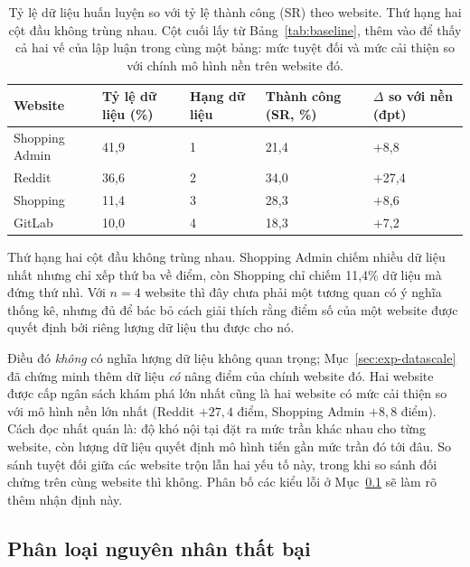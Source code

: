 \begin{table}[htbp]
  \centering
  \caption[Tỷ lệ dữ liệu so với điểm số theo website]{Tỷ lệ dữ liệu huấn
    luyện so với tỷ lệ thành công (SR) theo website. Thứ hạng hai cột đầu không
    trùng nhau. Cột cuối lấy từ Bảng~\ref{tab:baseline}, thêm vào để thấy cả hai vế
    của lập luận trong cùng một bảng: mức tuyệt đối và mức cải thiện so với chính
  mô hình nền trên website đó.}
  \label{tab:crosssite}
  \small
  \begin{tabular}{@{}L{3.4cm} R{2.7cm} R{2.2cm} R{2.4cm} R{2.6cm}@{}}
    \toprule
    \textbf{Website} & \textbf{Tỷ lệ dữ liệu (\%)} & \textbf{Hạng dữ liệu} & \textbf{Thành công (SR, \%)} & \textbf{$\Delta$ so với nền (đpt)} \\
    \midrule
    Shopping Admin & 41{,}9 & 1 & 21{,}4 & $+$8{,}8 \\
    Reddit & 36{,}6 & 2 & 34{,}0 & $+$27{,}4 \\
    Shopping & 11{,}4 & 3 & 28{,}3 & $+$8{,}6 \\
    GitLab & 10{,}0 & 4 & 18{,}3 & $+$7{,}2 \\
    \bottomrule
  \end{tabular}
\end{table}

Thứ hạng hai cột đầu không trùng nhau. Shopping Admin chiếm nhiều dữ liệu nhất nhưng chỉ xếp thứ ba về điểm, còn Shopping chỉ chiếm 11{,}4\% dữ liệu mà đứng thứ nhì. Với $n = 4$ website thì đây chưa phải một tương quan có ý nghĩa thống kê, nhưng đủ để bác bỏ cách giải thích rằng điểm số của một website được quyết định bởi riêng lượng dữ liệu thu được cho nó.

Điều đó \emph{không} có nghĩa lượng dữ liệu không quan trọng; Mục~\ref{sec:exp-datascale} đã chứng minh thêm dữ liệu \emph{có} nâng điểm của chính website đó. Hai website được cấp ngân sách khám phá lớn nhất cũng là hai website có mức cải thiện so với mô hình nền lớn nhất (Reddit $+27{,}4$ điểm, Shopping Admin $+8{,}8$ điểm). Cách đọc nhất quán là: độ khó nội tại đặt ra mức trần khác nhau cho từng website, còn lượng dữ liệu quyết định mô hình tiến gần mức trần đó tới đâu. So sánh tuyệt đối giữa các website trộn lẫn hai yếu tố này, trong khi so sánh đối chứng trên cùng website thì không. Phân bố các kiểu lỗi ở Mục~\ref{sec:exp-failures} sẽ làm rõ thêm nhận định này.

\subsection{Phân loại nguyên nhân thất bại}
\label{sec:exp-failures}


